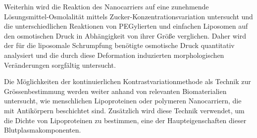 

Weiterhin wird die Reaktion des Nanocarriers auf eine zunehmende Lösungsmittel-Osmolalität mittels Zucker-Konzentrationsvariation untersucht und die unterschiedlichen Reaktionen von PEGylierten und einfachen Liposomen auf den osmotischen Druck in Abhängigkeit von ihrer Größe verglichen. Daher wird der für die liposomale Schrumpfung benötigte osmotische Druck quantitativ analysiert und die durch diese Deformation induzierten morphologischen Veränderungen sorgfältig untersucht.




Die Möglichkeiten der kontinuierlichen Kontrastvariationmethode als Technik zur Grössenbestimmung werden weiter anhand von relevanten Biomaterialien untersucht, wie menschlichen Lipoproteinen oder polymeren Nanocarriern, die mit Antikörpern beschichtet sind. Zusätzlich wird diese Technik verwendet, um die Dichte von Lipoproteinen zu bestimmen, eine der Haupteigenschaften dieser Blutplasmakomponenten.








\normalsize

\cleardoublepage
